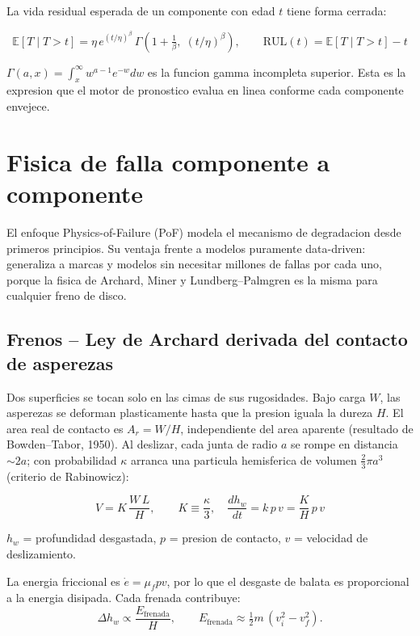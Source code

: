 \documentclass[10.5pt,a4paper]{article}
\begin{document}
La vida residual esperada de un componente con edad $t$ tiene forma cerrada:
\begin{mathbox}
$$\mathbb{E}[T \mid T>t] = \eta\, e^{(t/\eta)^\beta}\,
  \Gamma\!\left(1+\tfrac{1}{\beta},\; (t/\eta)^\beta\right), \qquad
  \mathrm{RUL}(t) = \mathbb{E}[T\mid T>t] - t$$

$\Gamma(a,x) = \int_x^\infty w^{a-1}e^{-w}dw$ es la funcion gamma incompleta
superior. Esta es la expresion que el motor de pronostico evalua en linea
conforme cada componente envejece.
\end{mathbox}

\section{Fisica de falla componente a componente}

El enfoque Physics-of-Failure (PoF) modela el mecanismo de degradacion desde
primeros principios. Su ventaja frente a modelos puramente data-driven: generaliza
a marcas y modelos sin necesitar millones de fallas por cada uno, porque la fisica
de Archard, Miner y Lundberg--Palmgren es la misma para cualquier freno de disco.

\subsection{Frenos -- Ley de Archard derivada del contacto de asperezas}

Dos superficies se tocan solo en las cimas de sus rugosidades. Bajo carga $W$,
las asperezas se deforman plasticamente hasta que la presion iguala la dureza
$H$. El area real de contacto es $A_r = W/H$, independiente del area aparente
(resultado de Bowden--Tabor, 1950). Al deslizar, cada junta de radio $a$ se rompe
en distancia $\sim 2a$; con probabilidad $\kappa$ arranca una particula hemisferica
de volumen $\frac{2}{3}\pi a^3$ (criterio de Rabinowicz):

\begin{mathbox}
$$\boxed{V = K\,\frac{W\,L}{H}}, \qquad K \equiv \frac{\kappa}{3}, \quad
  \frac{dh_w}{dt} = k\,p\,v = \frac{K}{H}\,p\,v$$

$h_w$ = profundidad desgastada, $p$ = presion de contacto, $v$ = velocidad de deslizamiento.
\end{mathbox}

La energia friccional es $\dot{e} = \mu_f p v$, por lo que el desgaste de balata
es proporcional a la energia disipada. Cada frenada contribuye:
$$\Delta h_w \propto \frac{E_{\mathrm{frenada}}}{H}, \qquad
  E_{\mathrm{frenada}} \approx \tfrac{1}{2}m\,(v_i^2 - v_f^2).$$
\end{document}

